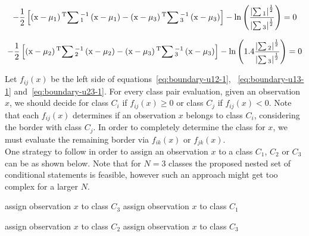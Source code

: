 \documentclass[paper=a4, fontsize=11pt]{scrartcl} %
\numberwithin{equation}{section} %
\numberwithin{figure}{section} %
\numberwithin{table}{section} %
\begin{document}
\begin{equation}
        -\frac{1}{2}\left[\left(\text{x} - \mu_{1}\right)\textsuperscript{T}{\sum\text{$^{-1}_{1}$}}\left(\text{x} - \mu_{1}\right)
        - \left(\text{x} - \mu_{3}\right)\textsuperscript{T}{\sum\text{$^{-1}_{3}$}}\left(\text{x} - \mu_{3}\right)\right] - \ln{\left(\frac{{\left|\sum\text{$_{1}$}\right|}^{\frac{1}{2}}}{{\left|\sum\text{$_{3}$}\right|}^{\frac{1}{2}}}\right)} = 0
    \label{eq:boundary-u13-1}
\end{equation}

\begin{equation}
        -\frac{1}{2}\left[\left(\text{x} - \mu_{2}\right)\textsuperscript{T}{\sum\text{$^{-1}_{2}$}}\left(\text{x} - \mu_{2}\right)
        - \left(\text{x} - \mu_{3}\right)\textsuperscript{T}{\sum\text{$^{-1}_{3}$}}\left(\text{x} - \mu_{3}\right)\right] - \ln{\left(1.4\frac{{\left|\sum\text{$_{2}$}\right|}^{\frac{1}{2}}}{{\left|\sum\text{$_{3}$}\right|}^{\frac{1}{2}}}\right)} = 0
    \label{eq:boundary-u23-1}
\end{equation}

Let $f_{ij}(x)$ be the left side of equations~\ref{eq:boundary-u12-1},
~\ref{eq:boundary-u13-1} and~\ref{eq:boundary-u23-1}. For every class pair 
evaluation, given an observation $x$, we should decide for class $C_i$ if $f_{ij}(x) \geq 0$ or class 
$C_j$ if $f_{ij}(x) < 0$. Note that each $f_{ij}(x)$ determines if an 
observation $x$ belongs to class $C_i$, considering the border with class 
$C_j$. In order to completely determine the class for $x$, we must evaluate the 
remaining border via $f_{ik}(x)$ or $f_{jk}(x)$.\\

One strategy to follow in order to assign an observation $x$ to a class $C_1$, 
$C_2$ or $C_3$ can be as shown below. Note that for $N = 3$ classes the 
proposed nested set of conditional statements is feasible, however such an 
approach might get too complex for a larger $N$.\\

\begin{algorithmic}


        \State assign observation $x$ to class $C_3$
    \Else
        \State assign observation $x$ to class $C_1$
    \EndIf

    \State assign observation $x$ to class $C_2$
\Else 
    \State assign observation $x$ to class $C_3$
\EndIf

\EndFor
\end{algorithmic}
\end{document}
